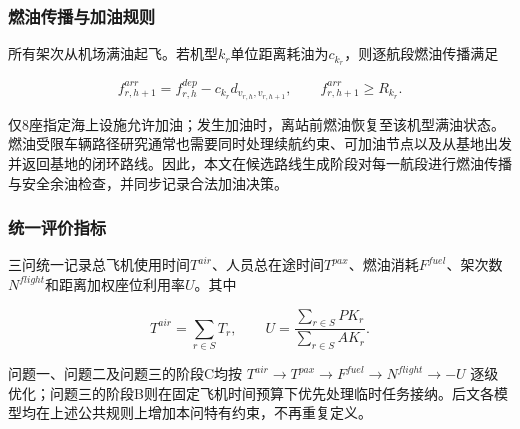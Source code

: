 \subsubsection{燃油传播与加油规则}

所有架次从机场满油起飞。若机型$k_r$单位距离耗油为$c_{k_r}$，则逐航段燃油传播满足

\[
f_{r,h+1}^{arr}
=
f_{r,h}^{dep}
-
c_{k_r}d_{v_{r,h},v_{r,h+1}},
\qquad
f_{r,h+1}^{arr}\ge R_{k_r}.
\tag{5-4}
\]

仅8座指定海上设施允许加油；发生加油时，离站前燃油恢复至该机型满油状态。燃油受限车辆路径研究通常也需要同时处理续航约束、可加油节点以及从基地出发并返回基地的闭环路线\cite{sundar2017}。因此，本文在候选路线生成阶段对每一航段进行燃油传播与安全余油检查，并同步记录合法加油决策。

\subsubsection{统一评价指标}

三问统一记录总飞机使用时间$T^{air}$、人员总在途时间$T^{pax}$、燃油消耗$F^{fuel}$、架次数$N^{flight}$和距离加权座位利用率$U$。其中

\[
T^{air}
=
\sum_{r\in S}T_r,
\qquad
U
=
\frac{\sum_{r\in S}PK_r}
{\sum_{r\in S}AK_r}.
\tag{5-5}
\]

问题一、问题二及问题三的阶段C均按
$T^{air}\rightarrow T^{pax}\rightarrow F^{fuel}\rightarrow N^{flight}\rightarrow -U$
逐级优化；问题三的阶段B则在固定飞机时间预算下优先处理临时任务接纳。后文各模型均在上述公共规则上增加本问特有约束，不再重复定义。
